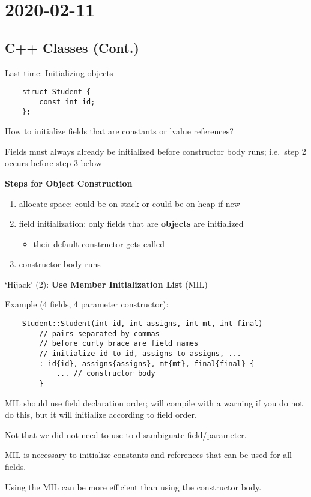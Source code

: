 \section{2020-02-11}
\subsection{C++ Classes (Cont.)}
Last time: Initializing objects

\begin{lstlisting}
    struct Student {
        const int id;
    };
\end{lstlisting}
How to initialize fields that are constants or lvalue references?

Fields must always already be initialized before constructor body runs;
i.e.\ step 2 occurs before step 3 below

\textbf{Steps for Object Construction}
\begin{enumerate}[label=(\arabic*)]
    \item allocate space: could be on stack or could be on heap if new
    \item field initialization: only fields that are \textbf{objects} are initialized
          \begin{itemize}
              \item their default constructor gets called
          \end{itemize}
    \item constructor body runs
\end{enumerate}
`Hijack' (2): \textbf{Use Member Initialization List} (MIL)

Example (4 fields, 4 parameter constructor):
\begin{lstlisting}
    Student::Student(int id, int assigns, int mt, int final)
        // pairs separated by commas
        // before curly brace are field names
        // initialize id to id, assigns to assigns, ...
        : id{id}, assigns{assigns}, mt{mt}, final{final} {
            ... // constructor body
        }
\end{lstlisting}
MIL should use field declaration order; will compile with a warning if you do not
do this, but it will initialize according to field order.

Not that we did not need to use  to disambiguate field/parameter.

MIL is necessary to initialize constants and references that can be used for
all fields.

Using the MIL can be more efficient than using the constructor body.

